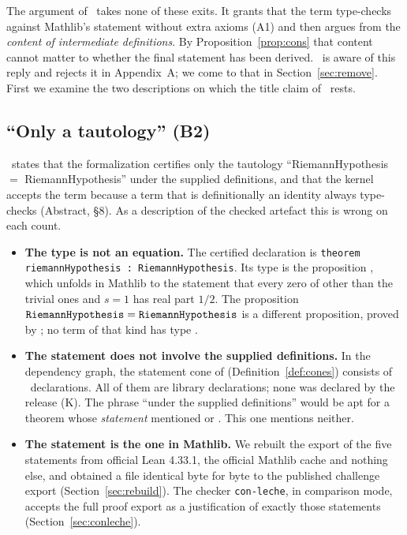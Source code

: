 The argument of \N\ takes none of these exits. It grants that the term type-checks against Mathlib's statement without extra axioms (A1) and then argues from the \emph{content of intermediate definitions}.
By Proposition~\ref{prop:cons} that content cannot matter to whether the final statement has been derived.
\N\ is aware of this reply and rejects it in Appendix~A; we come to that in Section~\ref{sec:remove}. First we examine the two descriptions on which the title claim of \N\ rests.

\subsection{``Only a tautology'' (B2)}
\label{sec:taut}

\N\ states that the formalization certifies only the tautology ``RiemannHypothesis $=$ RiemannHypothesis'' under the supplied definitions, and that the kernel accepts the term because a term that is definitionally an identity always type-checks (Abstract, \S8).
As a description of the checked artefact this is wrong on each count.

\begin{itemize}
\item \textbf{The type is not an equation.} The certified declaration is \texttt{theorem riemannHypothesis : RiemannHypothesis}. Its type is the proposition , which unfolds in Mathlib to the statement that every zero of  other than the trivial ones and $s = 1$ has real part $1/2$.
The proposition $\text{\texttt{RiemannHypothesis}} = \text{\texttt{RiemannHypothesis}}$ is a different proposition, proved by ; no term of that kind has type .
\item \textbf{The statement does not involve the supplied definitions.} In the dependency graph, the statement cone of  (Definition~\ref{def:cones}) consists of \NstmtMain\ declarations.
All of them are library declarations; none was declared by the release (\textsf{K}). The phrase ``under the supplied definitions'' would be apt for a theorem whose \emph{statement} mentioned  or . This one mentions neither.
\item \textbf{The statement is the one in Mathlib.} We rebuilt the export of the five statements from official Lean 4.33.1, the official Mathlib cache and nothing else, and obtained a file identical byte for byte to the published challenge export (Section~\ref{sec:rebuild}).
The checker \texttt{con-leche}, in comparison mode, accepts the full proof export as a justification of exactly those statements (Section~\ref{sec:conleche}).
\end{itemize}

